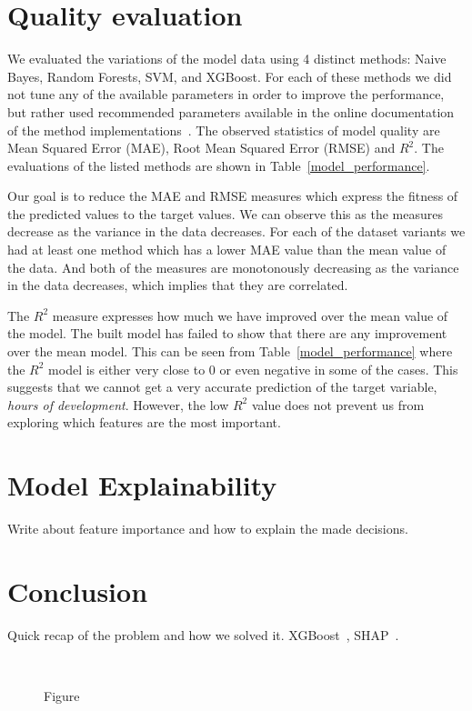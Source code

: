 \documentclass[conference]{IEEEtran}
\begin{document}
\section{Quality evaluation}
We evaluated the variations of the model data using 4 distinct methods: Naive Bayes, Random Forests, SVM, and XGBoost. For each of these methods we did not tune any of the available parameters in order to improve the performance, but rather used recommended parameters available in the online documentation of the method implementations~\cite{chen2016xgboost, scikit-learn}. The observed statistics of model quality are Mean Squared Error (MAE), Root Mean Squared Error (RMSE) and $R^2$. The evaluations of the listed methods are shown in Table~\ref{model_performance}.

Our goal is to reduce the MAE and RMSE measures which express the fitness of the predicted values to the target values. We can observe this as the measures decrease as the variance in the data decreases. For each of the dataset variants we had at least one method which has a lower MAE value than the mean value of the data. And both of the measures are monotonously decreasing as the variance in the data decreases, which implies that they are correlated.

The $R^2$ measure expresses how much we have improved over the mean value of the model. The built model has failed to show that there are any improvement over the mean model. This can be seen from Table~\ref{model_performance} where the $R^2$ model is either very close to $0$ or even negative in some of the cases. This suggests that we cannot get a very accurate prediction of the target variable, \textit{hours of development}. However, the low $R^2$ value does not prevent us from exploring which features are the most important.

\section{Model Explainability}
Write about feature importance and how to explain the made decisions.

\section{Conclusion}
Quick recap of the problem and how we solved it.
XGBoost~\cite{chen2016xgboost}, SHAP~\cite{lundberg2020local2global}.

\begin{figure}[!t]
	\renewcommand{\arraystretch}{1.3}
	\centering
	\caption{Figure}
	 \\
	\label{f7}
\end{figure}
\end{document}
